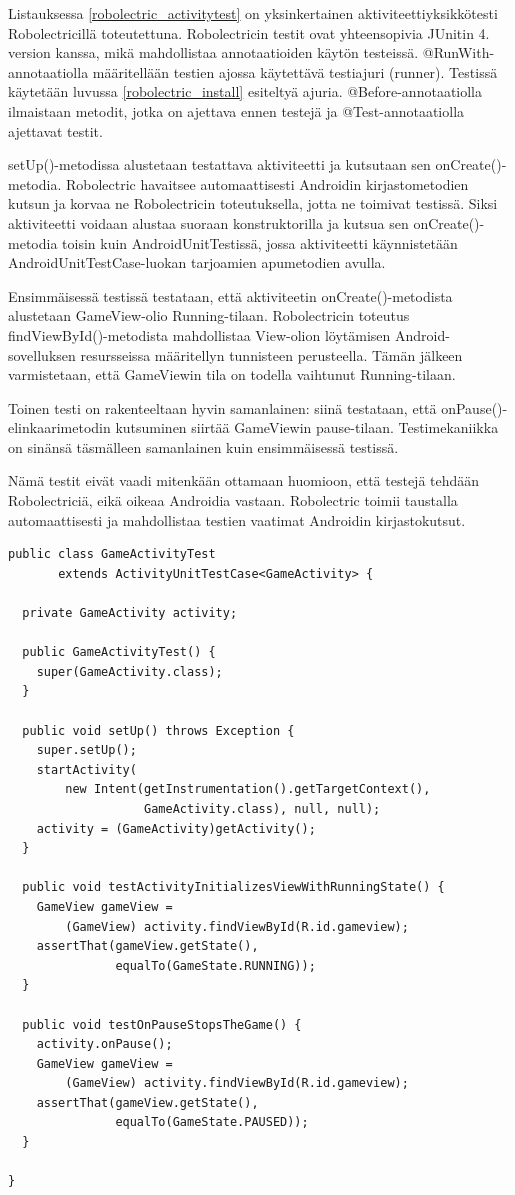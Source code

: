 Listauksessa \ref{robolectric_activitytest} on yksinkertainen aktiviteettiyksikkötesti Robolectricillä toteutettuna. Robolectricin testit ovat yhteensopivia JUnitin 4. version kanssa, mikä mahdollistaa annotaatioiden käytön testeissä. @RunWith-annotaatiolla määritellään testien ajossa käytettävä testiajuri (runner). Testissä käytetään luvussa \ref{robolectric_install} esiteltyä ajuria. @Before-annotaatiolla ilmaistaan metodit, jotka on ajettava ennen testejä ja @Test-annotaatiolla ajettavat testit.

setUp()-metodissa alustetaan testattava aktiviteetti ja kutsutaan sen onCreate()-metodia. Robolectric havaitsee automaattisesti Androidin kirjastometodien kutsun ja korvaa ne Robolectricin toteutuksella, jotta ne toimivat testissä. Siksi aktiviteetti voidaan alustaa suoraan konstruktorilla ja kutsua sen onCreate()-metodia toisin kuin AndroidUnitTestissä, jossa aktiviteetti käynnistetään AndroidUnitTestCase-luokan tarjoamien apumetodien avulla.

Ensimmäisessä testissä testataan, että aktiviteetin onCreate()-metodista alustetaan GameView-olio Running-tilaan. Robolectricin toteutus findViewById()-metodista mahdollistaa View-olion löytämisen Android-sovelluksen resursseissa määritellyn tunnisteen perusteella. Tämän jälkeen varmistetaan, että GameViewin tila on todella vaihtunut Running-tilaan. 

Toinen testi on rakenteeltaan hyvin samanlainen: siinä testataan, että onPause()-elinkaarimetodin kutsuminen siirtää GameViewin pause-tilaan. Testimekaniikka on sinänsä täsmälleen samanlainen kuin ensimmäisessä testissä.

Nämä testit eivät vaadi mitenkään ottamaan huomioon, että testejä tehdään Robolectriciä, eikä oikeaa Androidia vastaan. Robolectric toimii taustalla automaattisesti ja mahdollistaa testien vaatimat Androidin kirjastokutsut.

\begin{lstlisting}[float,label=androidunit_activitytest,caption=Yksinkertainen aktiviteettiyksikkötesti ActivityUnitTestCasen avulla]
public class GameActivityTest 
       extends ActivityUnitTestCase<GameActivity> {

  private GameActivity activity;

  public GameActivityTest() {
  	super(GameActivity.class);
  }

  public void setUp() throws Exception {
  	super.setUp();
  	startActivity(
  	    new Intent(getInstrumentation().getTargetContext(), 
  	               GameActivity.class), null, null);
    activity = (GameActivity)getActivity();
  }

  public void testActivityInitializesViewWithRunningState() {
    GameView gameView = 
        (GameView) activity.findViewById(R.id.gameview);
    assertThat(gameView.getState(), 
               equalTo(GameState.RUNNING));
  }
  
  public void testOnPauseStopsTheGame() {
  	activity.onPause();
  	GameView gameView = 
  	    (GameView) activity.findViewById(R.id.gameview);
  	assertThat(gameView.getState(), 
  	           equalTo(GameState.PAUSED));
  }
  
}
\end{lstlisting}

